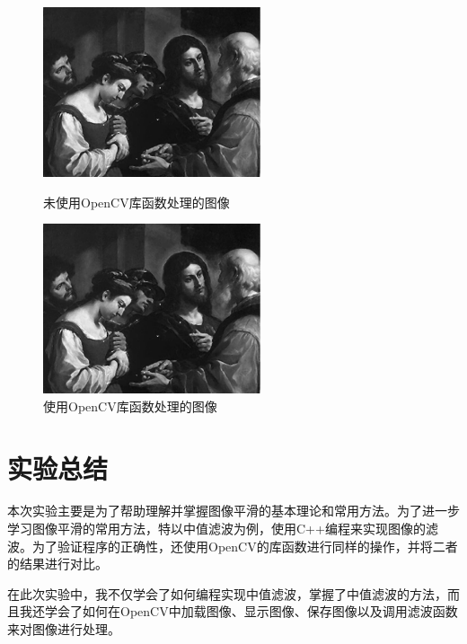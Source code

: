 \documentclass[a4paper]{ctexrep}
\begin{document}
\begin{figure}[H]
\centering
\begin{varwidth}[t]{\textwidth}
\vspace{0pt}
\includegraphics[height=5cm]{img/processedImage3.pdf}
\caption{未使用OpenCV库函数处理的图像}
\label{fig:thirdProc}
\end{varwidth}%
\quad
\begin{varwidth}[t]{\textwidth}
\vspace{0pt}
\centering
\includegraphics[height=5cm]{img/processedImage4.pdf}
\caption{使用OpenCV库函数处理的图像}
\label{fig:forthProc}
\end{varwidth}
\end{figure}


\section{实验总结}

本次实验主要是为了帮助理解并掌握图像平滑的基本理论和常用方法。为了进一步学习图像平滑的常用方法，特以中值滤波为例，使用C++编程来实现图像的滤波。为了验证程序的正确性，还使用OpenCV的库函数进行同样的操作，并将二者的结果进行对比。

在此次实验中，我不仅学会了如何编程实现中值滤波，掌握了中值滤波的方法，而且我还学会了如何在OpenCV中加载图像、显示图像、保存图像以及调用滤波函数来对图像进行处理。
\end{document}
